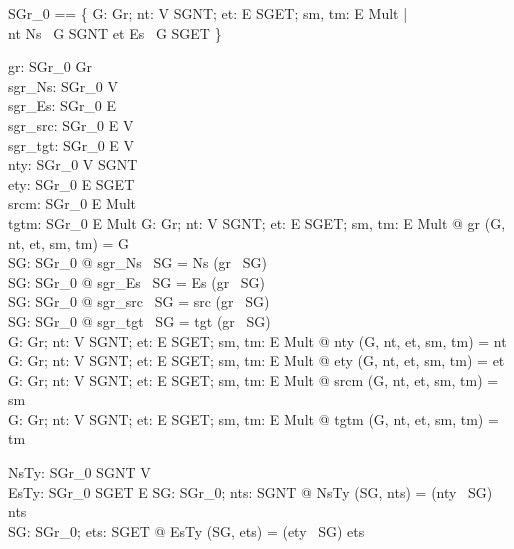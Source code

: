 \begin{zed}
SGr_0 == \{  G: Gr; nt: V \pfun  SGNT; et: E \pfun  SGET; sm, tm: E \pfun  Mult | \\ \quad  
nt \in  Ns~ G \fun  SGNT 
\land  et \in  Es~ G \fun  SGET \}
\end{zed}

\begin{axdef}
  gr: SGr_0 \fun  Gr\\
  sgr\_Ns: SGr_0 \fun  \power  V\\
  sgr\_Es: SGr_0 \fun  \power  E\\
  sgr\_src: SGr_0 \fun  E \pfun  V\\
  sgr\_tgt: SGr_0 \fun  E \pfun  V\\
  nty: SGr_0 \fun  V \pfun  SGNT\\
  ety: SGr_0 \fun  E \pfun  SGET\\
  srcm: SGr_0 \fun  E \pfun  Mult\\
  tgtm: SGr_0 \fun  E \pfun  Mult
\where
  \forall  G: Gr; nt: V \pfun  SGNT; et: E \pfun  SGET; sm, tm: E \pfun  Mult @ gr (G, nt, et, sm, tm) = G\\
  \forall  SG: SGr_0 @ sgr\_Ns~ SG = Ns (gr~ SG)\\
  \forall  SG: SGr_0 @ sgr\_Es~ SG = Es (gr~ SG)\\
  \forall  SG: SGr_0 @ sgr\_src~ SG = src (gr~ SG)\\
  \forall  SG: SGr_0 @ sgr\_tgt~ SG = tgt (gr~ SG)\\
  \forall  G: Gr; nt: V \pfun  SGNT; et: E \pfun  SGET; sm, tm: E \pfun  Mult @ nty (G, nt, et, sm, tm) = nt\\
  \forall  G: Gr; nt: V \pfun  SGNT; et: E \pfun  SGET; sm, tm: E \pfun  Mult @ ety (G, nt, et, sm, tm) = et\\
  \forall  G: Gr; nt: V \pfun  SGNT; et: E \pfun  SGET; sm, tm: E \pfun  Mult @ srcm (G, nt, et, sm, tm) = sm\\
  \forall  G: Gr; nt: V \pfun  SGNT; et: E \pfun  SGET; sm, tm: E \pfun  Mult @ tgtm (G, nt, et, sm, tm) = tm
\end{axdef}

\begin{axdef}
  NsTy: SGr_0 \cross  \power  SGNT \fun  \power  V\\
  EsTy: SGr_0 \cross  \power  SGET \fun  \power  E
\where
  \forall  SG: SGr_0; nts: \power  SGNT @ NsTy (SG, nts) = (nty~ SG) \inv  \limg  nts \rimg \\
  \forall  SG: SGr_0; ets: \power  SGET @ EsTy (SG, ets) = (ety~ SG) \inv  \limg  ets \rimg 
\end{axdef}

